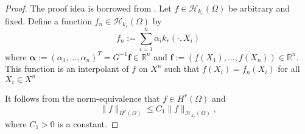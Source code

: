 \documentclass[11pt]{article}
\theoremstyle{remark}
\theoremstyle{example}
\theoremstyle{remark}
\newcommand{\cd}{\cdot}
\renewcommand{\H}{{\mathcal{H}}}
\newcommand{\R}{\mathbb{R}}
\newcommand{\bmalpha}{{\bm \alpha}}
\newcommand{\bmf}{{\bm f}}
\newcommand{\citep}{\cite}
\begin{document}
\begin{proof}
The proof idea is borrowed from \cite[Theorem 1]{BriOatGirOsbSej15}. 
Let $f \in \H_{k_r}(\Omega)$ be arbitrary and fixed.
Define a function $f_n \in \H_{k_r}(\Omega)$ by 
\[ f_n:= \sum_{i=1}^n \alpha_i k_r(\cd,X_i) \]
 where $\bmalpha := (\alpha_1,\dots,\alpha_n)^T = G^{-1} \bmf \in \R^n$ and $\bmf := (f(X_1),\dots,f(X_n)) \in \R^n$.
This function is an interpolant of $f$ on $X^n$ such that $f(X_i) = f_n(X_i)$ for all $X_i \in X^n$  %

It follows from the norm-equivalence that $f \in H^r(\Omega)$ and 
\begin{equation} \label{eq:norm_equivalence_110}
\| f \|_{H^r(\Omega)} \leq C_1 \| f \|_{\H_{k_r}(\Omega)},
\end{equation}
where $C_1 > 0$ is a constant.


\end{proof}
\end{document}
